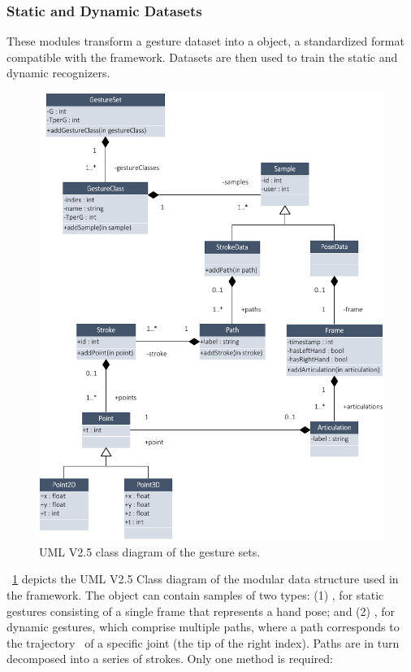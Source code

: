 \subsubsection{Static and Dynamic Datasets}
These modules transform a gesture dataset into a  object, \ie a standardized format compatible with the framework. Datasets are then used to train the static and dynamic recognizers.
\begin{figure}[!ht]
    \centering
    \vspace{-6pt}
    \captionsetup{justification=centering}
    \includegraphics[width=0.9\linewidth]{Figures/QuantumLeap/Architecture/QuantumLeap-UML.pdf}
    \caption{UML V2.5 class diagram of the gesture sets.}
    \label{fig:quantumleap:dataset-uml}
\end{figure}
\fig~\ref{fig:quantumleap:dataset-uml} depicts the UML V2.5 \cite{Bush:2011} Class diagram of the modular data structure used in the framework. The  object can contain samples of two types: (1) , for static gestures consisting of a single frame that represents a hand pose; and (2) , for dynamic gestures, which comprise multiple paths, where a path corresponds to the trajectory~\cite{Caputo:2018} of a specific joint (\eg the tip of the right index). Paths are in turn decomposed into a series of strokes. Only one method is required:
